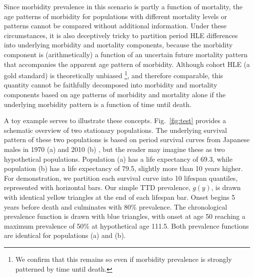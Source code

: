 \documentclass[12pt,oneside,letterpaper,doublespacing]{article}  %
\begin{document}
Since morbidity prevalence in this scenario is partly a function of mortality,
 the age patterns of morbidity for populations with different mortality
levels or patterns cannot be compared without additional information. Under
these circumstances, it is also deceptively tricky to partition period HLE
differences into underlying morbidity and mortality components, because the
morbidity component is (arithmetically) a function of an uncertain future mortality pattern
that accompanies the apparent age pattern of morbidity. Although cohort HLE (a
gold standard) is theoretically unbiased \citep{imai2007estimation}\footnote{We confirm that this remains so even if morbidity prevalence is strongly patterned by time until death.}, and therefore comparable, this quantity cannot be faithfully
decomposed into morbidity and mortality components based on age patterns of morbidity and mortality alone if
the underlying morbidity pattern is a function of time until death.

A toy example serves to illustrate these concepts. Fig.~\ref{fig:test}
provides a schematic overview of two stationary populations. The
underlying survival pattern of these two populations is based on period survival
curves from Japanese males in 1970 (a) and 2010 (b) \citep{HMD2018}, but the reader may
imagine these as two hypothetical populations. Population (a) has a life
expectancy of 69.3, while population (b) has a life expectancy of 79.5, slightly
more than 10 years higher. For demonstration, we partition each survival curve
into 10 lifespan quantiles, represented with horizontal bars. Our simple
TTD prevalence, $g(y)$, is drawn with identical yellow triangles at
the end of each lifespan bar. Onset begins 5 years before death and culminates with 80\%
prevalence. The chronological prevalence function is drawn with blue triangles,
with onset at age 50 reaching a maximum prevalence of 50\% at hypothetical age
111.5. Both prevalence functions are identical for populations (a) and (b). 
\end{document}
